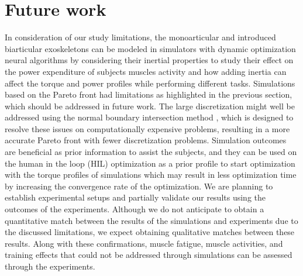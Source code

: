 \documentclass[10pt,letterpaper]{article}
\begin{document}
\section{Future work}
In consideration of our study limitations,  the monoarticular and introduced biarticular exoskeletons can be modeled in simulators with dynamic optimization neural algorithms \cite{110,111,112,180} by considering their inertial properties to study their effect on the power expenditure of subjects muscles activity and how adding inertia can affect the torque and power profiles while performing different tasks. 
Simulations based on the Pareto front had limitations as highlighted in the previous section, which should be addressed in future work. The large discretization might well be addressed using the normal boundary intersection method \cite{108}, which is designed to resolve these issues on computationally expensive problems, resulting in a more accurate Pareto front with fewer discretization problems.
Simulation outcomes are beneficial as prior information to assist the subjects, and they can be used on the human in the loop (HIL) optimization \cite{109} as a prior profile to start optimization with the torque profiles of simulations which may result in less optimization time by increasing the convergence rate of the optimization. We are planning to establish experimental setups and partially validate our results using the outcomes of the experiments. Although we do not anticipate to obtain a quantitative match between the results of the simulations and experiments due to the discussed limitations, we expect obtaining qualitative matches between these results. Along with these confirmations, muscle fatigue, muscle activities, and training effects that could not be addressed through simulations can be assessed through the experiments.
\end{document}
